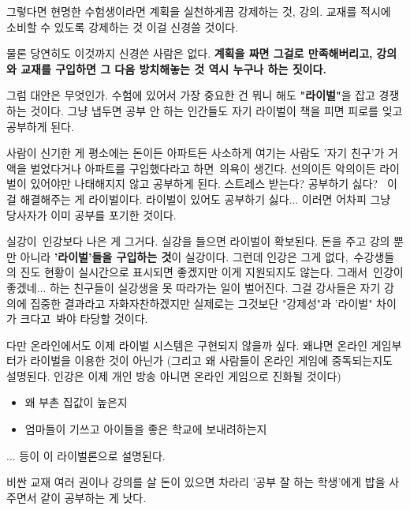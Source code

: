 그렇다면 현명한 수험생이라면
계획을 실천하게끔 강제하는 것,
강의. 교재를 적시에 소비할 수 있도록 강제하는 것
이걸 신경쓸 것이다.
\vspace{5mm}

물론 당연히도 이것까지 신경쓴 사람은 없다.
\textbf{계획을 짜면 그걸로 만족해버리고,}
\textbf{강의와 교재를 구입하면 그 다음 방치해놓는 것 역시 누구나 하는 짓이다.}
\vspace{5mm}

그럼 대안은 무엇인가.
수험에 있어서 가장 중요한 건 뭐니 해도 \textbf{"라이벌"}을 잡고 경쟁하는 것이다.
그냥 냅두면 공부 안 하는 인간들도 자기 라이벌이 책을 피면 피로를 잊고 공부하게 된다.
\vspace{5mm}

사람이 신기한 게 평소에는 돈이든 아파트든 사소하게 여기는 사람도
'자기 친구'가 거액을 벌었다거나 아파트를 구입했다라고 하면 의욕이 생긴다.
선의이든 악의이든 라이벌이 있어야만 나태해지지 않고 공부하게 된다.
스트레스 받는다? 공부하기 싫다?  이걸 해결해주는 게 라이벌이다.
라이벌이 있어도 공부하기 싫다... 이러면 어차피 그냥 당사자가 이미 공부를 포기한 것이다.
\vspace{5mm}

실강이 인강보다 나은 게 그거다.
실강을 들으면 라이벌이 확보된다.
돈을 주고 강의 뿐만 아니라 \textbf{'라이벌'들을 구입하는 것}이 실강이다.
그런데 인강은 그게 없다, 수강생들의 진도 현황이 실시간으로 표시되면 좋겠지만 이게 지원되지도 않는다.
그래서 인강이 좋겠네... 하는 친구들이 실강생을 못 따라가는 일이 벌어진다.
그걸 강사들은 자기 강의에 집중한 결과라고 자화자찬하겠지만
실제로는 그것보단 "강제성"과 '라이벌" 차이가 크다고 봐야 타당할 것이다.
\vspace{5mm}

다만 온라인에서도 이제 라이벌 시스템은 구현되지 않을까 싶다.
왜냐면 온라인 게임부터가 라이벌을 이용한 것이 아닌가
(그리고 왜 사람들이 온라인 게임에 중독되는지도 설명된다.
인강은 이제 개인 방송 아니면 온라인 게임으로 진화될 것이다)
\vspace{5mm}

\begin{itemize}
    \item  왜 부촌 집값이 높은지
    \item  엄마들이 기쓰고 아이들을 좋은 학교에 보내려하는지
\end{itemize}
...
등이 이 라이벌론으로 설명된다.
\vspace{5mm}

비싼 교재 여러 권이나 강의를 살 돈이 있으면
차라리 '공부 잘 하는 학생'에게 밥을 사주면서 같이 공부하는 게 낫다.




